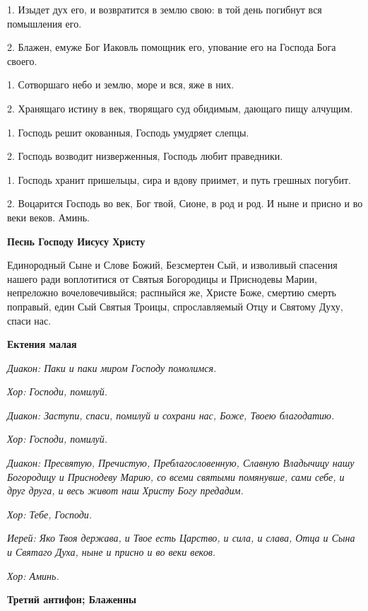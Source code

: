 1. Изыдет дух его, и возвратится в землю свою: в той день погибнут вся помышления его. 


2. Блажен, емуже Бог Иаковль помощник его, упование его на Господа Бога своего. 


1. Сотворшаго небо и землю, море и вся, яже в них. 


2. Хранящаго истину в век, творящаго суд обидимым, дающаго пищу алчущим. 


1. Господь решит окованныя, Господь умудряет слепцы. 


2. Господь возводит низверженныя, Господь любит праведники. 


1. Господь хранит пришельцы, сира и вдову приимет, и путь грешных погубит. 


2. Воцарится Господь во век, Бог твой, Сионе, в род и род. И ныне и присно и во веки веков. Аминь. 


\medskip\bfseries Песнь Господу Иисусу Христу \normalfont{}\nopagebreak


Единородный Сыне и Слове Божий, Безсмертен Сый, и изволивый спасения нашего ради воплотитися от Святыя Богородицы и Приснодевы Марии, непреложно вочеловечивыйся; распныйся же, Христе Боже, смертию смерть поправый, един Сый Святыя Троицы, спрославляемый Отцу и Святому Духу, спаси нас. 


\medskip\bfseries Ектения малая \normalfont{}\nopagebreak


\itshape Диакон:\normalfont{} Паки и паки миром Господу помолимся. 


\itshape Хор:\normalfont{} Господи, помилуй. 


\itshape Диакон:\normalfont{} Заступи, спаси, помилуй и сохрани нас, Боже, Твоею благодатию. 


\itshape Хор:\normalfont{} Господи, помилуй. 


\itshape Диакон:\normalfont{} Пресвятую, Пречистую, Преблагословенную, Славную Владычицу нашу Богородицу и Приснодеву Марию, со всеми святыми помянувше, сами себе, и друг друга, и весь живот наш Христу Богу предадим.


\itshape Хор:\normalfont{} Тебе, Господи. 


\itshape Иерей:\normalfont{} Яко Твоя держава, и Твое есть Царство, и сила, и слава, Отца и Сына и Святаго Духа, ныне и присно и во веки веков. 


\itshape Хор:\normalfont{} Аминь.


\medskip\bfseries Третий антифон; Блаженны \normalfont{}\nopagebreak


